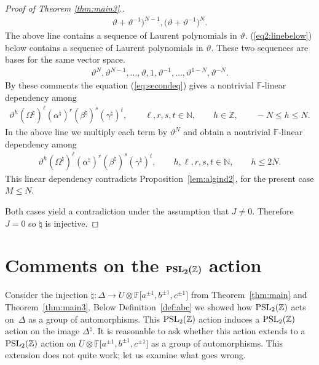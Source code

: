 \documentclass[pdftex]{sigma}
\numberwithin{equation}{section}
\begin{document}
\begin{proof}[Proof of Theorem \ref{thm:main3}.]
\begin{gather*}
\vartheta
+
\vartheta^{-1}\big)^{N-1},
\big(
\vartheta
+
\vartheta^{-1}\big)^N.
\end{gather*}
The above line
contains a sequence of
Laurent polynomials in $\vartheta$.
(\ref{eq2:linebelow})
below contains a sequence of
Laurent polynomials in $\vartheta$.
These two sequences are bases for the same vector space.
\begin{gather}
\label{eq2:linebelow}
\vartheta^N,  \vartheta^{N-1},  \ldots,  \vartheta,   1,
 \vartheta^{-1},
 \ldots,
 \vartheta^{1-N},
 \vartheta^{-N}.
\end{gather}
By these comments the  equation
(\ref{eq:secondeq})
gives a
 nontrivial $\mathbb F$-linear dependency
among
\begin{gather*}
\vartheta^h
(\Omega^\natural)^\ell (\alpha^\natural)^r (\beta^\natural)^s
(\gamma^\natural)^t,
 \qquad \ell, r,s,t \in \mathbb N, \qquad
h \in \mathbb Z, \qquad   -N \leq h \leq N.
\end{gather*}
In the above line we multiply each term by $\vartheta^N$ and
obtain
a nontrivial $\mathbb F$-linear dependency among
\begin{gather*}
\vartheta^h
(\Omega^\natural)^\ell (\alpha^\natural)^r
(\beta^\natural)^s (\gamma^\natural)^t
, \qquad h,\ell, r,s,t \in \mathbb N , \qquad
 h \leq 2N.
\end{gather*}
This linear dependency
contradicts
Proposition~\ref{lem:algind2},
for the present case
 $M\leq N$.


Both cases yield a contradiction
under the assumption
that $J\not=0$.
Therefore $J=0$ so $\natural$ is injective.
\end{proof}


\section[Comments on the ${\rm  {PSL}}_2(\mathbb Z)$ action]{Comments on the $\boldsymbol{{\rm  PSL}_2(\mathbb Z)}$ action}\label{section10}


Consider the injection
$\natural:\Delta \to
U \otimes
\mathbb F \lbrack a^{\pm 1}, b^{\pm 1}, c^{\pm 1}\rbrack $
 from
Theorem~\ref{thm:main}
and Theorem~\ref{thm:main3}.
Below Def\/inition~\ref{def:abc} we showed how
${\rm  {PSL}}_2(\mathbb Z)$ acts
 on~$\Delta$ as a group of automorphisms.
This
${\rm  {PSL}}_2(\mathbb Z)$ action
induces a
${\rm  {PSL}}_2(\mathbb Z)$ action on the image
$\Delta^\natural$.
It is reasonable to ask whether this action extends to
a
${\rm  {PSL}}_2(\mathbb Z)$ action on
$U\otimes
\mathbb F \lbrack a^{\pm 1}, b^{\pm 1}, c^{\pm 1}\rbrack $ as
a group of automorphisms.
This extension does not quite work;
let us
examine what goes wrong.
\end{document}
